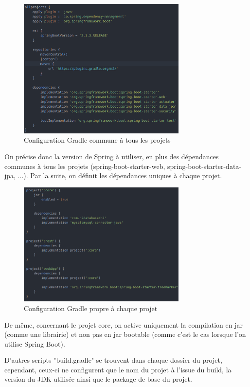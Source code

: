 			\begin{figure}[H]
				\centering\includegraphics[width=0.75\textwidth, keepaspectratio]{res/gradle_allprojects.png}
				\caption{Configuration Gradle commune à tous les projets}
			\end{figure}

			On précise donc la version de Spring à utiliser, en plus des dépendances communes à tous les projets (spring-boot-starter-web, spring-boot-starter-data-jpa, ...). Par la suite, on définit les dépendances uniques à chaque projet.

			\begin{figure}[H]
				\centering\includegraphics[width=0.75\textwidth, keepaspectratio]{res/gradle_project.png}
				\caption{Configuration Gradle propre à chaque projet}
			\end{figure}

			De même, concernant le projet core, on active uniquement la compilation en jar (comme une librairie) et non pas en jar bootable (comme c'est le cas lorsque l'on utilise Spring Boot).

			D'autres scripts "build.gradle" se trouvent dans chaque dossier du projet, cependant, ceux-ci ne configurent que le nom du projet à l'issue du build, la version du JDK utilisée ainsi que le package de base du projet.
